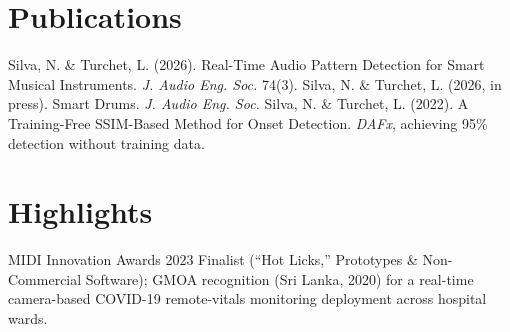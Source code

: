 \documentclass[11pt]{article}
\begin{document}
\section*{Publications}
Silva, N. \& Turchet, L. (2026). Real-Time Audio Pattern Detection for Smart Musical Instruments. \textit{J. Audio Eng. Soc.} 74(3). Silva, N. \& Turchet, L. (2026, in press). Smart Drums. \textit{J. Audio Eng. Soc.} Silva, N. \& Turchet, L. (2022). A Training-Free SSIM-Based Method for Onset Detection. \textit{DAFx}, achieving 95\% detection without training data.

\section*{Highlights}
MIDI Innovation Awards 2023 Finalist (``Hot Licks,'' Prototypes \& Non-Commercial Software); GMOA recognition (Sri Lanka, 2020) for a real-time camera-based COVID-19 remote-vitals monitoring deployment across hospital wards.
\end{document}
